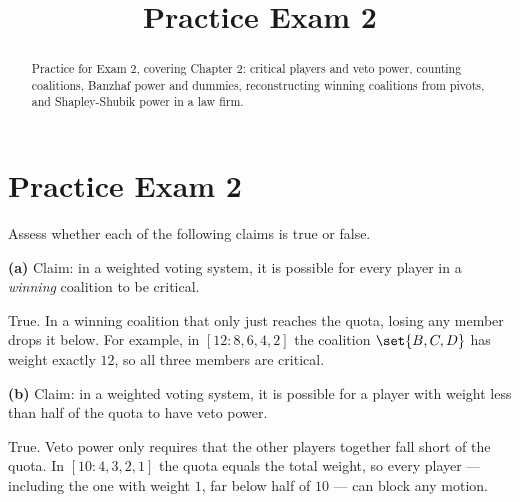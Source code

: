\documentclass[12pt]{ximera}
\title{Practice Exam 2}
\begin{document}
\begin{abstract}
Practice for Exam 2, covering Chapter 2: critical players and veto power, counting
coalitions, Banzhaf power and dummies, reconstructing winning coalitions from pivots,
and Shapley-Shubik power in a law firm.
\end{abstract}
\maketitle

\section*{Practice Exam 2}

\begin{problem}
Assess whether each of the following claims is true or false.

\begin{prompt}
\textbf{(a)} Claim: in a weighted voting system, it is possible for every player in a
\emph{winning} coalition to be critical.

\begin{multipleChoice}
\end{multipleChoice}

\begin{feedback}
True. In a winning coalition that only just reaches the quota, losing any member drops
it below. For example, in $[12:8,6,4,2]$ the coalition $\set{B,C,D}$ has weight exactly
$12$, so all three members are critical.
\end{feedback}
\end{prompt}

\begin{prompt}
\textbf{(b)} Claim: in a weighted voting system, it is possible for a player with weight
less than half of the quota to have veto power.

\begin{multipleChoice}
\end{multipleChoice}

\begin{feedback}
True. Veto power only requires that the other players together fall short of the quota.
In $[10:4,3,2,1]$ the quota equals the total weight, so every player --- including the
one with weight $1$, far below half of $10$ --- can block any motion.
\end{feedback}
\end{prompt}


\end{problem}
\end{document}
